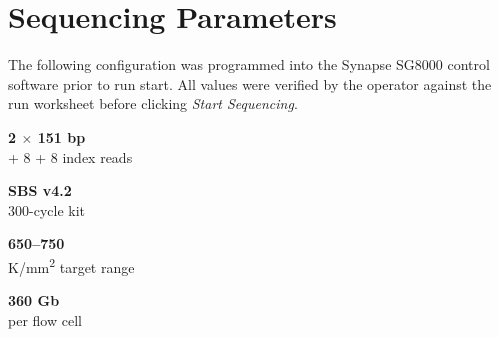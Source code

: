 
\section{Sequencing Parameters}
\label{sec:run-parameters}

The following configuration was programmed into the Synapse SG8000 control software prior to
run start. All values were verified by the operator against the run worksheet before clicking
\emph{Start Sequencing}.

\begin{minipage}[t]{0.235\linewidth}
\begin{stattile}
{\sffamily\bfseries\color{SeqVioletDark}\large 2 $\times$ 151 bp}\\[2pt]
{\sffamily\footnotesize\color{SeqGray}+ 8 + 8 index reads}
\end{stattile}
\end{minipage}\hfill
\begin{minipage}[t]{0.235\linewidth}
\begin{stattile}
{\sffamily\bfseries\color{SeqVioletDark}\large SBS v4.2}\\[2pt]
{\sffamily\footnotesize\color{SeqGray}300-cycle kit}
\end{stattile}
\end{minipage}\hfill
\begin{minipage}[t]{0.235\linewidth}
\begin{stattile}
{\sffamily\bfseries\color{SeqVioletDark}\large 650--750}\\[2pt]
{\sffamily\footnotesize\color{SeqGray}K/mm\textsuperscript{2} target range}
\end{stattile}
\end{minipage}\hfill
\begin{minipage}[t]{0.235\linewidth}
\begin{stattile}
{\sffamily\bfseries\color{SeqVioletDark}\large 360 Gb}\\[2pt]
{\sffamily\footnotesize\color{SeqGray}per flow cell}
\end{stattile}
\end{minipage}

\par\vspace{10pt}

